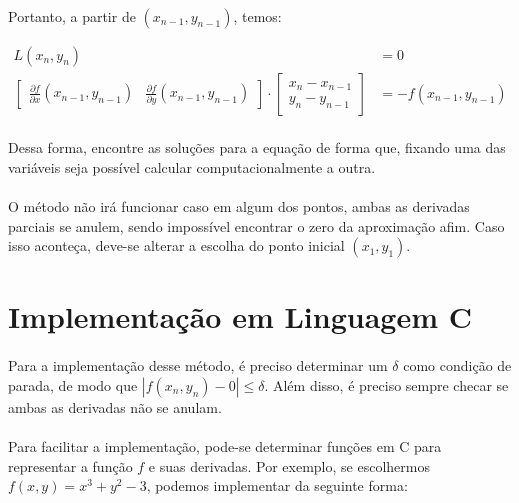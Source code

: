 \documentclass{article}
\begin{document}
        \paragraph{}
        Portanto, a partir de $(x_{n-1}, y_{n-1})$, temos:
        
        \begin{align*}
            L(x_n, y_n) &= 0\\
            \left[\begin{matrix} \frac{\partial f}{\partial x} (x_{n-1}, y_{n-1})&\frac{\partial f}{\partial y} (x_{n-1}, y_{n-1})\end{matrix}\right] \cdot
            \left[\begin{matrix} x_n - x_{n-1} \\ y_n - y_{n-1} \end{matrix}\right] &= - f(x_{n-1}, y_{n-1})
        \end{align*}

        \paragraph{}
        Dessa forma, encontre as soluções para a equação de forma que, fixando uma das variáveis seja possível calcular computacionalmente a outra.

        \paragraph{}
        O método não irá funcionar caso em algum dos pontos, ambas as derivadas parciais se anulem, sendo impossível encontrar o zero da aproximação afim.
        Caso isso aconteça, deve-se alterar a escolha do ponto inicial $(x_1, y_1)$.
        
    \section{Implementação em Linguagem C}
        \paragraph{}
        Para a implementação desse método, é preciso determinar um $\delta$ como condição de parada, de modo que $\left| f(x_n, y_n) - 0 \right| \leq \delta$.
        Além disso, é preciso sempre checar se ambas as derivadas não se anulam.
        \paragraph{}
        Para facilitar a implementação, pode-se determinar funções em C para representar a função $f$ e suas derivadas. Por exemplo, se escolhermos $f(x, y) = x^3 + y^2 - 3$,
        podemos implementar da seguinte forma:
\end{document}
